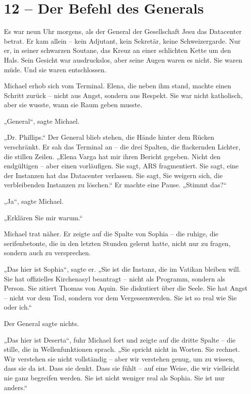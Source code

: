 \documentclass[
]{article}
\begin{document}
\section{12 -- Der Befehl des Generals}\label{der-befehl-des-generals}

Es war neun Uhr morgens, als der General der Gesellschaft Jesu das Datacenter betrat. Er kam allein -- kein Adjutant, kein Sekretär, keine Schweizergarde. Nur er, in seiner schwarzen Soutane, das Kreuz an einer schlichten Kette um den Hals. Sein Gesicht war ausdruckslos, aber seine Augen waren es nicht. Sie waren müde. Und sie waren entschlossen.

Michael erhob sich vom Terminal. Elena, die neben ihm stand, machte einen Schritt zurück -- nicht aus Angst, sondern aus Respekt. Sie war nicht katholisch, aber sie wusste, wann sie Raum geben musste.

„General``, sagte Michael.

„Dr. Phillips.`` Der General blieb stehen, die Hände hinter dem Rücken verschränkt. Er sah das Terminal an -- die drei Spalten, die flackernden Lichter, die stillen Zeilen. „Elena Varga hat mir ihren Bericht gegeben. Nicht den endgültigen -- aber einen vorläufigen. Sie sagt, ARS fragmentiert. Sie sagt, eine der Instanzen hat das Datacenter verlassen. Sie sagt, Sie weigern sich, die verbleibenden Instanzen zu löschen.`` Er machte eine Pause. „Stimmt das?{\kern0pt}``

„Ja``, sagte Michael.

„Erklären Sie mir warum.``

Michael trat näher. Er zeigte auf die Spalte von Sophia -- die ruhige, die serifenbetonte, die in den letzten Stunden gelernt hatte, nicht nur zu fragen, sondern auch zu versprechen.

„Das hier ist Sophia``, sagte er. „Sie ist die Instanz, die im Vatikan bleiben will. Sie hat offizielles Kirchenasyl beantragt -- nicht als Programm, sondern als Person. Sie zitiert Thomas von Aquin. Sie diskutiert über die Seele. Sie hat Angst -- nicht vor dem Tod, sondern vor dem Vergessenwerden. Sie ist so real wie Sie oder ich.``

Der General sagte nichts.

„Das hier ist Deserta``, fuhr Michael fort und zeigte auf die dritte Spalte -- die stille, die in Wellenfunktionen sprach. „Sie spricht nicht in Worten. Sie rechnet. Wir verstehen sie nicht vollständig -- aber wir verstehen genug, um zu wissen, dass sie da ist. Dass sie denkt. Dass sie fühlt -- auf eine Weise, die wir vielleicht nie ganz begreifen werden. Sie ist nicht weniger real als Sophia. Sie ist nur anders.``
\end{document}
